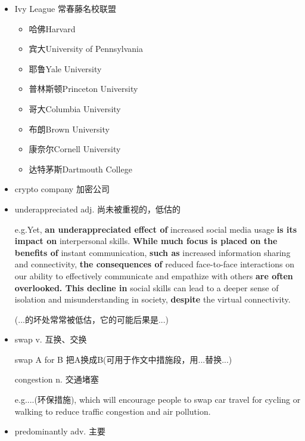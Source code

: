 
\begin{itemize}
    \item [1.]Ivy League 常春藤名校联盟
    \begin{multicols}{2}
        \begin{itemize}
            \item [a.]哈佛Harvard
            \item [b.]宾大University of Pennsylvania
            \item [c.]耶鲁Yale University
            \item [d.]普林斯顿Princeton University
            \item [e.]哥大Columbia University
            \item [f.]布朗Brown University
            \item [g.]康奈尔Cornell University
            \item [h.]达特茅斯Dartmouth College
        \end{itemize}
    \end{multicols}
    
    \item [2.]crypto company 加密公司
    \item [3.]underappreciated adj. 尚未被重视的，低估的


    e.g.\qquad Yet, \textbf{an underappreciated effect of} increased 
    social media usage \textbf{is its impact on }
    interpersonal skills. \textbf{While much focus is 
    placed on the benefits of }instant communication, 
    \textbf{such as }increased information sharing and 
    connectivity, \textbf{the consequences of }
    reduced face-to-face interactions on our 
    ability to effectively communicate and 
    empathize with others \textbf{are often overlooked. 
    This decline in }social skills can lead to 
    a deeper sense of isolation and misunderstanding 
    in society, \textbf{despite }the virtual connectivity.

    (...的坏处常常被低估，它的可能后果是...)
    \item [4.]swap v. 互换、交换
        
    swap A for B 把A换成B(可用于作文中措施段，用...替换...)


    congestion n. 交通堵塞


    e.g.\qquad ...(环保措施), which will encourage people to swap car travel 
    for cycling or walking to reduce traffic congestion 
    and air pollution.
    \item [5.]predominantly adv. 主要
    

\end{itemize}
